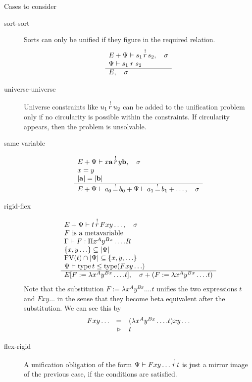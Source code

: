 Cases to consider
\begin{description}
\item[sort-sort]
Sorts can only be unified if they figure in the required relation.
$$
\begin{array}{l} 
    E + \Psi \vdash s_1 {\,\stackrel{!}{r}\,} s_2, \quad \sigma
    \\
    \Psi \vdash s_1 \mathrel{r} s_2
 \\ \hline 
    E, \quad \sigma
\end{array}
$$

\item[universe-universe] Universe constraints like $u_1 {\,\stackrel{!}{r}\,} u_2$ can be
added to the unification problem only if no circularity is possible within the
constraints. If circularity appears, then the problem is unsolvable.


\item[same variable]
$$
\begin{array}{l} 
    E + \Psi \vdash x \mathbf{a} {\,\stackrel{!}{r}\,} y \mathbf{b}, \quad \sigma
    \\
    x = y
    \\
    |\mathbf{a}| = |\mathbf{b}|
 \\ \hline 
    E + \Psi \vdash a_0 {\,\stackrel{!}{=}\,} b_0 + \Psi \vdash a_1 {\,\stackrel{!}{=}\,} b_1 + \ldots,
    \quad \sigma
\end{array}
$$






\item[rigid-flex]

$$
\begin{array}{l} 
    E + \Psi \vdash t {\,\stackrel{!}{r}\,} F x y \ldots, \quad \sigma
    \\
    \text{$F$ is a metavariable}
    \\
    \Gamma \vdash F: \Pi x^A y^{Bx} \ldots. R
    \\
    \{x, y \ldots\} \subseteq |\Psi|
    \\
    \text{FV}(t) \cap |\Psi| \subseteq \{x,y,\ldots\}
    \\
    \Psi \vdash \text{type}\, t \le \text{type}(F x y \ldots)
 \\ \hline 
    E[F := \lambda x^A y^{Bx}\ldots . t],
    \quad
    \sigma + (F := \lambda x^A y^{Bx}\ldots . t)
\end{array}
$$
%
Note that the substitution $F := \lambda x^A y^{Bx}\ldots . t$ unifies the two
expressions $t$ and $F x y \ldots$ in the sense that they become beta equivalent
after the substitution. We can see this by
$$
\begin{array}{lll}
    F x y \ldots &=& (\lambda x^A y^{Bx}\ldots . t) x y \ldots
    \\
    &{\,\triangleright\,}& t
\end{array}
$$


\item[flex-rigid]

A unification obligation of the form $\Psi \vdash F x y \ldots {\,\stackrel{!}{r}\,}
t$ is just a mirror image of the previous case, if the conditions are satisfied.




\end{description}
